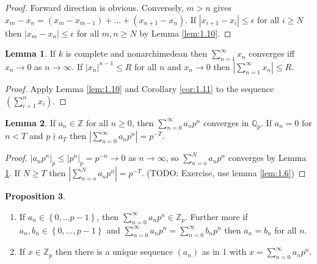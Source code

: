 \documentclass{article}
\newcommand{\Z}{\mathbb{Z}}
\newcommand{\Q}{\mathbb{Q}}
\newcommand{\rb}[1]{\left( #1 \right)}
\newcommand{\cb}[1]{\left\{ #1 \right\}}
\newcommand{\abs}[1]{\left\lvert #1 \right\rvert}
\theoremstyle{definition}\newtheorem{definition}{Definition}[section]
\theoremstyle{definition}\newtheorem{remark}[definition]{Remark}
\theoremstyle{definition}\newtheorem*{example}{Example}
\theoremstyle{definition}\newtheorem*{note}{Note}
\newtheorem{proposition}[definition]{Proposition}
\newtheorem{lemma}[definition]{Lemma}
\begin{document}
\begin{proof}
Forward direction is obvious. Conversely, $ m > n $ gives $ x_m - x_n = \rb{x_m - x_{m - 1}} + \dots + \rb{x_{n + 1} - x_n} $. If $ \abs{x_{i + 1} - x_i} \le \epsilon $ for all $ i \ge N $ then $ \abs{x_m - x_n} \le \epsilon $ for all $ m, n \ge N $ by Lemma \ref{lem:1.10}.
\end{proof}

\begin{lemma}
\label{lem:1.12}
If $ k $ is complete and nonarchimedean then $ \sum_{n = 1}^\infty x_n $ converges iff $ x_n \to 0 $ as $ n \to \infty $. If $ \abs{x_n}^{n - 1} \le R $ for all $ n $ and $ x_n \to 0 $ then $ \abs{\sum_{n = 1}^\infty x_n} \le R $.
\end{lemma}

\begin{proof}
Apply Lemma \ref{lem:1.10} and Corollary \ref{cor:1.11} to the sequence $ \rb{\sum_{i = 1}^n x_i} $.
\end{proof}

\begin{lemma}
\label{lem:1.13}
If $ a_n \in \Z $ for all $ n \ge 0 $, then $ \sum_{n = 0}^\infty a_np^n $ converges in $ \Q_p $. If $ a_n = 0 $ for $ n < T $ and $ p \nmid a_T $ then $ \abs{\sum_{n = 0}^\infty a_np^n} = p^{-T} $.
\end{lemma}

\begin{proof}
$ \abs{a_np^n}_p \le \abs{p^n}_p = p^{-n} \to 0 $ as $ n \to \infty $, so $ \sum_{n = o}^N a_np^n $ converges by Lemma \ref{lem:1.12}. If $ N \ge T $ then $ \abs{\sum_{n = o}^N a_np^n} = p^{-T} $. (TODO: Exercise, use lemma \ref{lem:1.6})
\end{proof}

\begin{proposition}
\label{prop:1.14}
\hfill
\begin{enumerate}
\item If $ a_n \in \cb{0, \dots p - 1} $, then $ \sum_{n = 0}^\infty a_np^n \in \Z_p $. Further more if $ a_n, b_n \in \cb{0, \dots, p - 1} $ and $ \sum_{n = 0}^\infty a_np^n = \sum_{n = 0}^\infty b_np^n $ then $ a_n = b_n $ for all $ n $.
\item If $ x \in \Z_p $ then there is a unique sequence $ \rb{a_n} $ as in 1 with $ x = \sum_{n = 0}^\infty a_np^n $.
\end{enumerate}
\end{proposition}
\end{document}
